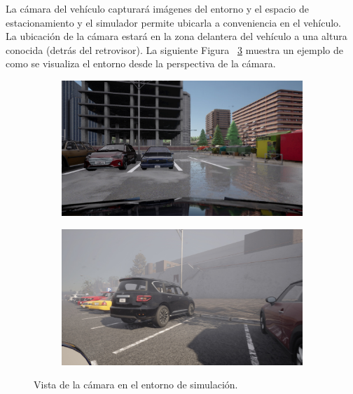 \noindent
La cámara del vehículo capturará imágenes del entorno y el espacio de estacionamiento y el simulador permite
ubicarla a conveniencia en el vehículo.\\
La ubicación de la cámara estará en la zona delantera del vehículo a una altura conocida (detrás del retrovisor).
La siguiente Figura ~\ref{fig:camera-view} muestra un ejemplo de como se visualiza el entorno desde la perspectiva de la cámara.

\begin{figure}[!ht]
    \centering
    \begin{subfigure}{0.4\textwidth}
        \includegraphics[width=\textwidth]{img/mirrow_camara_ex}\label {fig:camara}
    \end{subfigure}
    \begin{subfigure}{0.4\textwidth}
        \includegraphics[width=\textwidth]{img/mirrow_camara_ex2}\label {fig:camara2}
    \end{subfigure}
    \caption{Vista de la cámara en el entorno de simulación.}
    \label{fig:camera-view}
\end{figure}




